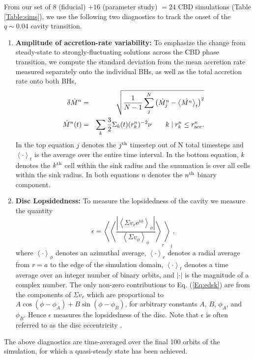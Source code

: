 From our set of $8$ (fiducial) $+16$ (parameter study) $=24$ CBD
simulations (Table \ref{Table:sims}), we use the following two
diagnostics to track the onset of the $q\sim 0.04$ cavity transition.
\begin{enumerate}
\item \textbf{Amplitude of accretion-rate variability:} To emphasize
  the change from steady-state to strongly-fluctuating solutions
  across the CBD phase transition, we compute the standard deviation
  from the mean accretion rate measured separately onto the individual
  BHs, as well as the total accretion rate onto both BHs,
\begin{eqnarray}
\delta \dot{M}^{n} &=& \sqrt{\frac{1}{N-1} \sum^N_j \left(\dot{M}^n_j -   \left<\dot{M^n}\right>_t \right)^{2}} \nonumber \\
\dot{M}^n(t) &=& \sum_{k} \frac{3}{2} \Sigma_k (t) (r^n_k)^{-2} \nu \qquad k \mid r^n_k \leq r^n_{\rm acc}.
\label{Eq:Mdot}
\end{eqnarray}
In the top equation $j$ denotes the
$j^{\rm th}$ timestep out of N total timesteps and $\left< \cdot \right>_{t}$ is the average over the entire time interval. In the bottom equation, $k$ denotes the $k^{\rm th}$ cell within the sink radius and the summation is over all cells within the sink radius. In both equations $n$ denotes the $n^{\rm th}$ binary component.
\item \textbf{Disc Lopsidedness:} To measure the lopsidedness of the
  cavity we measure the quantity
\begin{equation}
\epsilon = \left< \left< \frac{ \left| \left< \Sigma v_r \mbox{e}^{i \phi} \right>_{\phi} \right| }{\left< \Sigma v_{\phi}\right>_{\phi}}\right>_{r} \right>_{t},
\label{Eq:edsk}
\end{equation}
where $\left< \cdot \right>_{\phi}$ denotes an azimuthal average, $\left< \cdot \right>_{r}$ 
denotes a radial average from $r=a$ to the edge of the simulation domain, $\left< \cdot \right>_{t}$ 
denotes a time average over an integer number of binary orbits,
and $| \cdot |$ is the magnitude of a complex number. The only non-zero 
contributions to Eq. (\ref{Eq:edsk}) are from the components of $\Sigma v_r$ 
which are proportional to $A\cos{(\phi - \phi_A)} + B\sin{(\phi - \phi_B)}$, 
for arbitrary constants $A$, $B$, $\phi_A$, and $\phi_B$. Hence $\epsilon$ 
measures the lopsidedness of the disc. Note that $\epsilon$ is often referred to as the 
disc eccentricity \citep[{\em e.g.},][]{MacFadyen:2008,Farris:2014}.
\end{enumerate}
The above diagnostics are time-averaged over the final 100 orbits of
the simulation, for which a quasi-steady state has been achieved.
\\

